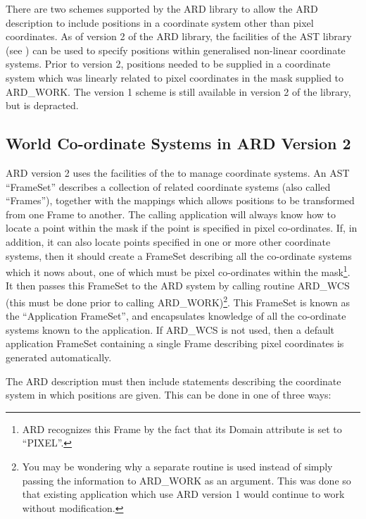 There are two schemes supported by the ARD library to allow the ARD 
description to include positions in a coordinate system other than pixel 
coordinates. As of version 2 of the ARD library, the facilities of the
AST library (see ) can be used to specify
positions within generalised non-linear coordinate systems. Prior to 
version 2, positions needed to be supplied in a coordinate system which
was linearly related to pixel coordinates in the mask supplied to
ARD\_WORK. The version 1 scheme is still available in version 2 of the
library, but is depracted.

\subsection{World Co-ordinate Systems in ARD Version 2}

ARD version 2 uses the facilities of the  to
manage coordinate systems. An AST ``FrameSet'' describes a collection of
related coordinate systems (also called ``Frames''), together with the
mappings which allows positions to be transformed from one Frame to
another. The calling application will always know how to locate a point
within the mask if the point is specified in pixel co-ordinates. If, in
addition, it can also locate points specified in one or more other
coordinate systems, then it should create a FrameSet describing all the
co-ordinate systems which it nows about, one of which must be pixel
co-ordinates within the mask\footnote{ARD recognizes this Frame by the
fact that its Domain attribute is set to ``PIXEL''.}. It then passes this
FrameSet to the ARD system by calling routine ARD\_WCS (this must be done
prior to calling ARD\_WORK)\footnote{You may be wondering why a separate
routine is used instead of simply passing the information to ARD\_WORK as
an argument. This was done so that existing application which use ARD
version 1 would continue to work without modification.}. This FrameSet is
known as the ``Application FrameSet'', and encapsulates knowledge of all
the co-ordinate systems known to the application. If ARD\_WCS is not
used, then a default application FrameSet containing a single Frame
describing pixel coordinates is generated automatically.

The ARD description must then include statements describing the 
coordinate system in which positions are given. This can be done in one
of three ways:

